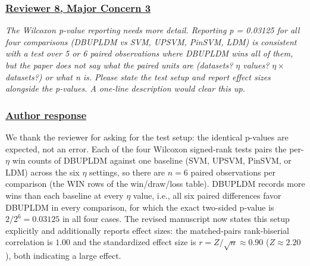 \documentclass[journal,12pt, onecolumn]{IEEEtran}
\begin{document}
{\color{customgreen}
\subsubsection*{\underline{\textbf{Reviewer 8, Major Concern 3}}}
\emph{The Wilcoxon p-value reporting needs more detail. Reporting p = 0.03125 for all four comparisons (DBUPLDM vs SVM, UPSVM, PinSVM, LDM) is consistent with a test over 5 or 6 paired observations where DBUPLDM wins all of them, but the paper does not say what the paired units are (datasets? $\eta$ values? $\eta \times$ datasets?) or what n is. Please state the test setup and report effect sizes alongside the p-values. A one-line description would clear this up.}
}


{\color{black}
\subsubsection*{\textbf{\underline{Author response}}}
We thank the reviewer for asking for the test setup: the identical p-values are expected, not an error. Each of the four Wilcoxon signed-rank tests pairs the per-$\eta$ win counts of DBUPLDM against one baseline (SVM, UPSVM, PinSVM, or LDM) across the six $\eta$ settings, so there are $n=6$ paired observations per comparison (the WIN rows of the win/draw/loss table). DBUPLDM records more wins than each baseline at every $\eta$ value, i.e., all six paired differences favor DBUPLDM in every comparison, for which the exact two-sided p-value is $2/2^6=0.03125$ in all four cases. The revised manuscript now states this setup explicitly and additionally reports effect sizes: the matched-pairs rank-biserial correlation is $1.00$ and the standardized effect size is $r=Z/\sqrt{n}\approx 0.90$ ($Z\approx 2.20$), both indicating a large effect.
}
\end{document}

